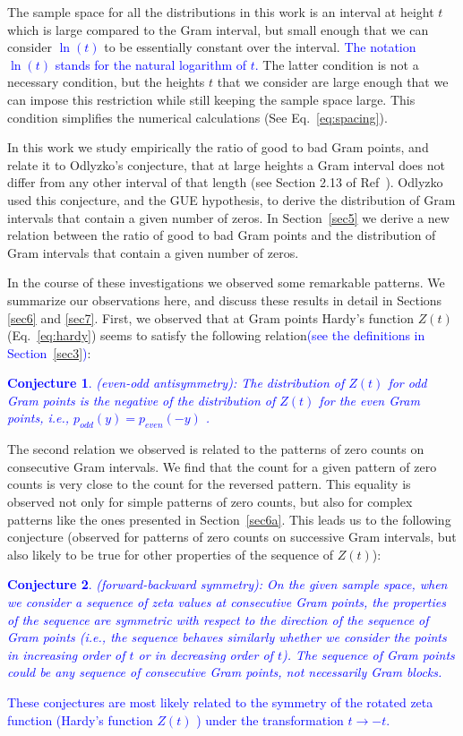 \documentclass[twoside]{article}
\newtheorem{mydef}{Conjecture}
\theoremstyle{definition}
\begin{document}
The sample space for all the distributions in this work is an interval  at height $t$ which is large compared to the Gram interval, but small enough that we can consider \textcolor{blue}{$\ln (t)$} to be essentially constant over the interval. \textcolor{blue}{The notation $\ln (t)$ stands for the natural logarithm of $t$.} The latter condition is not a necessary condition, but the heights $t$ that we consider are large enough that we can impose this restriction while still keeping the sample space large. This condition simplifies the numerical calculations (See Eq.~\ref{eq:spacing}). 

In this work we study empirically the ratio of good to bad Gram points, and relate it to Odlyzko's conjecture,  that at large heights a Gram interval does not differ from any other interval of that length (see Section 2.13 of Ref~\cite{Odlyzko 1992}). Odlyzko used this conjecture, and the GUE hypothesis, to derive the distribution of Gram intervals that contain a given number of zeros.
In Section~\ref{sec5} we derive a new relation between the ratio of good to bad Gram points and the distribution of Gram intervals that contain a given number of zeros.  

In the course of these investigations we observed some remarkable patterns. 
We summarize our observations here, and discuss these results in detail in Sections \ref{sec6} and \ref{sec7}.
First, we observed that at Gram points Hardy's function $Z(t)$ (Eq.~\ref{eq:hardy}) seems to satisfy the following relation\textcolor{blue}{(see the definitions in Section~\ref{sec3})}:
 \textcolor{blue}{
 \begin{mydef}\label{antisymmetry}
(even-odd antisymmetry): The distribution of $Z(t)$ for odd Gram points is the negative of the distribution of $Z(t)$ for the even Gram points, i.e., $p_{odd}(y) = p_{even}(-y)$ .
\end{mydef}
}
The second relation we observed is related to the patterns of zero counts on consecutive Gram intervals.  We find that the count for
a given pattern of zero counts  is very close to the count for the reversed pattern. This equality is observed not only for simple patterns of zero counts, but also for complex patterns like the ones presented in Section~\ref{sec6a}. This leads us to the following conjecture (observed for patterns of zero counts on successive Gram intervals, but also likely to be true for other properties of the sequence of $Z(t)$):
 \textcolor{blue}{
 \begin{mydef}\label{symmetry}
(forward-backward symmetry): On the given sample space, when we consider a sequence of zeta values at consecutive Gram points, the properties of the sequence are symmetric with respect to the direction of the sequence of Gram points (i.e., the sequence behaves similarly whether we consider the points in increasing order of $t$ or in decreasing order of $t$). The sequence of Gram points could be any sequence of consecutive Gram points, not necessarily Gram blocks.
\end{mydef}
}
 \textcolor{blue}{These conjectures are most likely related to the symmetry  of the rotated zeta function (Hardy's function $Z(t)$ ) under the transformation $t \rightarrow -t$.} 
 
\end{document}
